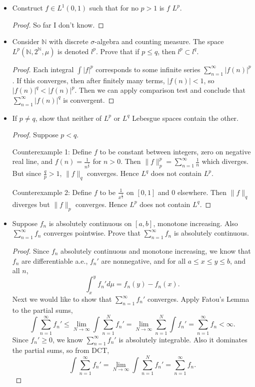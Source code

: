 \begin{itemize}
\begin{proof}
	Finally, by definition of $f$, obviously $+\infty  \in S$.
\end{proof}
\item Construct $f \in L^1(0,1)$ such that for no $p>1$ is $f$ $L^p$.
\begin{proof}
	So far I don't know.
\end{proof}
\item Consider $\mathbb{N}$ with discrete $\sigma$-algebra and counting measure. The space $L^p(\mathbb{N}, 2^{\mathbb{N}}, \mu)$ is denoted $l^p$. Prove that if $p \le q$, then $l^p \subset l^q$.
\begin{proof}
	Each integral $\int |f|^p$ corresponds to some infinite series  $\sum_{n=1}^{\infty} |f(n)|^p$. If this converges, then after finitely many terms, $|f(n)| < 1$, so $|f(n)|^q < |f(n)|^p$. Then we can apply comparison test and conclude that $\sum_{n=1}^{\infty} |f(n)|^q$ is convergent.
\end{proof}
\item If $p \neq q$, show that neither of $L^p$ or  $L^q$ Lebesgue spaces contain the other.
\begin{proof}
	Suppose $p < q$.

	Counterexample 1: Define $f$ to be constant between integers, zero on negative real line, and $f(n) = \frac{1}{n^{\frac{1}{p}}}$ for $n >0$.
	Then $\|f\|_p^p = \sum_{n= 1}^{\infty} \frac{1}{n}$ which diverges. But since $\frac{q}{p}>1$, $\|f\|_q$ converges. Hence $L^q$ does not contain $L^p$.

	Counterexample 2: Define $f$ to be $\frac{1}{x^{\frac{1}{q}}}$ on $[0,1]$ and $0$ elsewhere. Then $\|f\|_q$ diverges but $\|f\|_p$ converges. Hence $L^p$ does not contain $L^q$.
\end{proof}


	\item Suppose $f_n$ is absolutely continuous on $[a,b]$, monotone increasing. Also $\sum_{n=1}^{\infty} f_n$ converges pointwise. Prove that $\sum_{n=1}^{\infty} f_n$ is absolutely continuous.
\begin{proof}
	Since $f_n$ absolutely continuous and monotone increasing, we know that $f_n$ are differentiable a.e., $f_n'$ are nonnegative, and for all $a\le x \le  y \le b$,  and all $n$,
	\[
		\int _x^y f_n' d \mu = f_n(y) - f_n(x)
	.\] 
	Next we would like to show that $\sum_{n=1}^{\infty} f_n'$ converges. Apply Fatou's Lemma to the partial sums,
	\[
		\int \sum_{n=1}^\infty  f_n' \le \lim_{N \to \infty } \int \sum_{n = 1}^N f_n' = \lim_{N \to \infty } \sum_{n=1}^N \int f_n' = \sum_{n=1}^{\infty} f_n < \infty 
	.\] 
	Since $f_n' \ge 0$, we know $\sum_{n=1}^\infty  f_n'$ is absolutely integrable. Also it dominates the partial sums, so from DCT,
	\[
		 \int \sum_{n=1}^{\infty} f_n'= \lim_{N\to \infty } \int \sum_{n=1}^{N} f_n' 
		 = \sum_{n=1}^{\infty} f_n
	.\] 


\end{proof}
\end{itemize}

